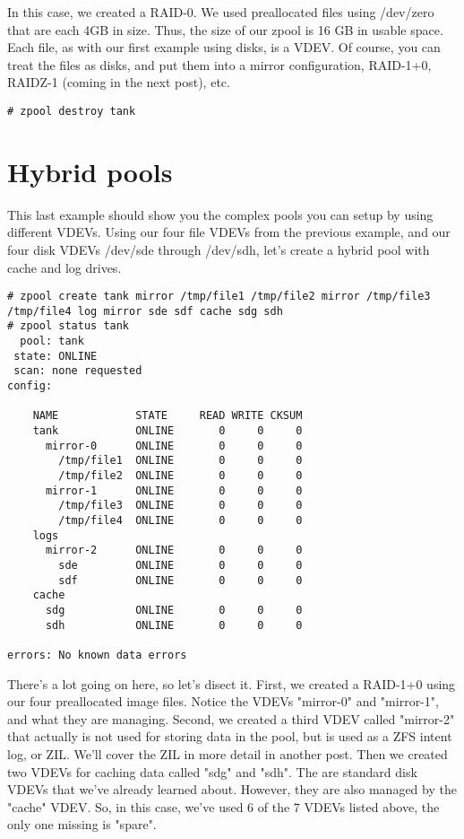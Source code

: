 \documentclass[landscape]{book}
\begin{document}
In this case, we created a RAID-0. We used preallocated files using
/dev/zero that are each 4GB in size. Thus, the size of our zpool is 16 GB
in usable space. Each file, as with our first example using disks, is a
VDEV. Of course, you can treat the files as disks, and put them into a
mirror configuration, RAID-1+0, RAIDZ-1 (coming in the next post), etc.

\begin{lstlisting}
# zpool destroy tank
\end{lstlisting}

\section{Hybrid pools}
This last example should show you the complex pools you can setup by using
different VDEVs. Using our four file VDEVs from the previous example, and
our four disk VDEVs /dev/sde through /dev/sdh, let's create a hybrid pool
with cache and log drives.

\begin{lstlisting}
# zpool create tank mirror /tmp/file1 /tmp/file2 mirror /tmp/file3 /tmp/file4 log mirror sde sdf cache sdg sdh
# zpool status tank
  pool: tank
 state: ONLINE
 scan: none requested
config:

    NAME            STATE     READ WRITE CKSUM
    tank            ONLINE       0     0     0
      mirror-0      ONLINE       0     0     0
        /tmp/file1  ONLINE       0     0     0
        /tmp/file2  ONLINE       0     0     0
      mirror-1      ONLINE       0     0     0
        /tmp/file3  ONLINE       0     0     0
        /tmp/file4  ONLINE       0     0     0
    logs
      mirror-2      ONLINE       0     0     0
        sde         ONLINE       0     0     0
        sdf         ONLINE       0     0     0
    cache
      sdg           ONLINE       0     0     0
      sdh           ONLINE       0     0     0

errors: No known data errors
\end{lstlisting}

There's a lot going on here, so let's disect it. First, we created a RAID-1+0
using our four preallocated image files. Notice the VDEVs "mirror-0" and
"mirror-1", and what they are managing. Second, we created a third VDEV called
"mirror-2" that actually is not used for storing data in the pool, but is used
as a ZFS intent log, or ZIL. We'll cover the ZIL in more detail in another
post. Then we created two VDEVs for caching data called "sdg" and "sdh". The
are standard disk VDEVs that we've already learned about. However, they are
also managed by the "cache" VDEV. So, in this case, we've used 6 of the 7 VDEVs
listed above, the only one missing is "spare".
\end{document}
